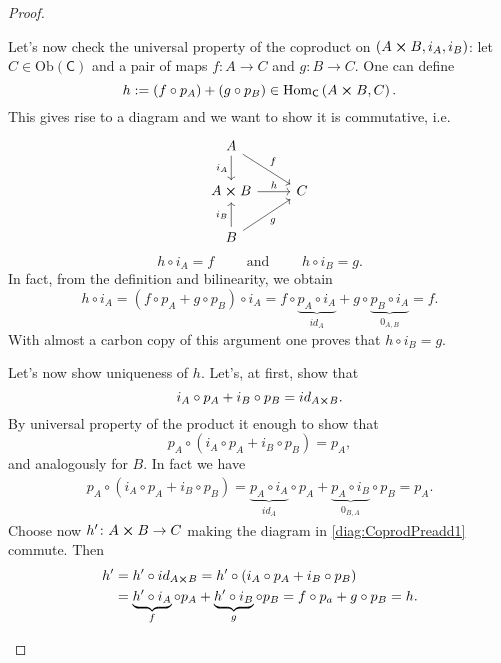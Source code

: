 \documentclass[../Main]{subfiles}
\begin{document}
\begin{proof}
\begin{enumerate}
			Let's now check the universal property of the coproduct
			on $\left(A \cross B, i_A, i_B\right)$:
			let $C \in \mathrm{Ob} \left(\mathsf{C}\right)$ and a pair of maps
			$f\colon A \to C$ and $g\colon B \to C$.
			One can define 
			\begin{equation}
				h := \left( f \circ p_A \right) +
				\left( g \circ p_B \right)
				\in \mathrm{Hom}_{\mathsf{C}} \left( A \cross B, C \right)
			.\end{equation} 
			This gives rise to a diagram and we want to show it is commutative, i.e.
			\begin{equation}\label{diag:CoprodPreadd1}
			\begin{tikzcd}
				A \arrow[rd, "f", rightarrow] \arrow[d, "i_A"', rightarrow] &
				\\
				A \cross B \arrow[r, "h", rightarrow] &
				C\\
				B \arrow[ru, "g"', rightarrow] \arrow[u, "i_B", rightarrow] &
			\end{tikzcd}
			\end{equation} 
			\begin{equation}
			h \circ i_A = f \qquad \text{ and } \qquad
			h \circ i_B = g
			.\end{equation} 
			In fact, from the definition and bilinearity, we obtain
			\begin{equation}
			h \circ i_A = 
			\left( f \circ p_A + g \circ p_B \right) \circ i_A =
			f \circ \underbrace{p_A \circ i_A}_{id_A} + 
			g \circ \underbrace{p_B \circ i_A}_{0_{A,B}} =
			f
			.\end{equation} 
			With almost a carbon copy of this argument one proves that $h \circ i_B = g$.

			Let's now show uniqueness of $h$.
			Let's, at first, show that
			\begin{equation}
			i_A \circ p_A + i_B \circ p_B = id_{A \cross B}
			.\end{equation} 
			By universal property of the product it enough to show that
			\begin{equation}
				p_A \circ (i_A \circ p_A + i_B \circ p_B) = p_A
			,\end{equation} 
			and analogously for $B$.
			In fact we have
			\begin{align}
				p_A \circ (i_A \circ p_A + i_B \circ p_B) =
				\underbrace{p_A \circ i_A}_{id_A} \circ p_A + 
				\underbrace{p_A \circ i_B}_{0_{B, A}} \circ p_B =
				p_A
			.\end{align} 
			Choose now $h' \colon A \cross B \to C$
			making the diagram in \eqref{diag:CoprodPreadd1} commute.
			Then
			\begin{align}
				h' &=
				h' \circ id_{A \cross B} =
				h' \circ \left( i_A \circ p_A +
				i_B \circ p_B\right) \\
				   &=
				\underbrace{h' \circ i_A}_{f} \circ p_A +
				\underbrace{h' \circ i_B}_{g} \circ p_B =
				f \circ p_a + g \circ p_B = h \qedhere
			.\end{align} 
	\end{enumerate}
\end{proof}
\end{document}
